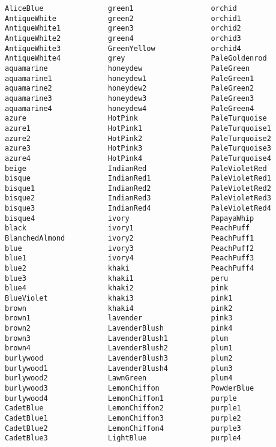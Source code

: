 \documentclass{book}
\begin{document}
\begin{verbatim}
AliceBlue               green1                  orchid
AntiqueWhite            green2                  orchid1
AntiqueWhite1           green3                  orchid2
AntiqueWhite2           green4                  orchid3
AntiqueWhite3           GreenYellow             orchid4
AntiqueWhite4           grey                    PaleGoldenrod
aquamarine              honeydew                PaleGreen
aquamarine1             honeydew1               PaleGreen1
aquamarine2             honeydew2               PaleGreen2
aquamarine3             honeydew3               PaleGreen3
aquamarine4             honeydew4               PaleGreen4
azure                   HotPink                 PaleTurquoise
azure1                  HotPink1                PaleTurquoise1
azure2                  HotPink2                PaleTurquoise2
azure3                  HotPink3                PaleTurquoise3
azure4                  HotPink4                PaleTurquoise4
beige                   IndianRed               PaleVioletRed
bisque                  IndianRed1              PaleVioletRed1
bisque1                 IndianRed2              PaleVioletRed2
bisque2                 IndianRed3              PaleVioletRed3
bisque3                 IndianRed4              PaleVioletRed4
bisque4                 ivory                   PapayaWhip
black                   ivory1                  PeachPuff
BlanchedAlmond          ivory2                  PeachPuff1
blue                    ivory3                  PeachPuff2
blue1                   ivory4                  PeachPuff3
blue2                   khaki                   PeachPuff4
blue3                   khaki1                  peru
blue4                   khaki2                  pink
BlueViolet              khaki3                  pink1
brown                   khaki4                  pink2
brown1                  lavender                pink3
brown2                  LavenderBlush           pink4
brown3                  LavenderBlush1          plum
brown4                  LavenderBlush2          plum1
burlywood               LavenderBlush3          plum2
burlywood1              LavenderBlush4          plum3
burlywood2              LawnGreen               plum4
burlywood3              LemonChiffon            PowderBlue
burlywood4              LemonChiffon1           purple
CadetBlue               LemonChiffon2           purple1
CadetBlue1              LemonChiffon3           purple2
CadetBlue2              LemonChiffon4           purple3
CadetBlue3              LightBlue               purple4

\end{verbatim}
\end{document}

